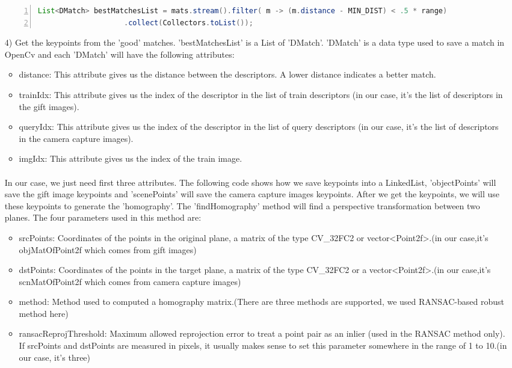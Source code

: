 \begin{enumerate}
\begin{lstlisting}[language={java},
        numbers=left,basicstyle=\small\ttfamily,breaklines=true]
List<DMatch> bestMatchesList = mats.stream().filter( m -> (m.distance - MIN_DIST) < .5 * range)
                    .collect(Collectors.toList());
\end{lstlisting} 
\item[4)] Get the keypoints from the 'good' matches. 'bestMatchesList' is a List of 'DMatch'. 'DMatch' is a data type used to save a match in OpenCv and each 'DMatch' will have the following attributes:
\begin{itemize}
\item distance: This attribute gives us the distance between the descriptors. A lower distance indicates a better match.
\item trainIdx: This attribute gives us the index of the descriptor in the list of train descriptors (in our case, it’s the list of descriptors in the gift images).
\item queryIdx: This attribute gives us the index of the descriptor in the list of query descriptors (in our case, it’s the list of descriptors in the camera capture images).
\item imgIdx: This attribute gives us the index of the train image. 
\end{itemize}
\paragraph{} In our case, we just need first three attributes. The following code shows how we save keypoints into a LinkedList, 'objectPoints' will save the gift image keypoints and 'scenePoints' will save the camera capture images keypoints. After we get the keypoints, we will use these keypoints to generate the 'homography'. The 'findHomography' method will find a perspective transformation between two planes. The four parameters used in this method are:
\begin{itemize}
\item srcPoints: Coordinates of the points in the original plane, a matrix of the type CV\_32FC2 or vector\textless Point2f\textgreater.(in our case,it's objMatOfPoint2f which comes from gift images)
\item dstPoints: Coordinates of the points in the target plane, a matrix of the type CV\_32FC2 or a vector\textless Point2f\textgreater .(in our case,it's scnMatOfPoint2f which comes from camera capture images)
\item method: Method used to computed a homography matrix.(There are three methods are supported, we used RANSAC-based robust method here)
\item ransacReprojThreshold: Maximum allowed reprojection error to treat a point pair as an inlier (used in the RANSAC method only). If srcPoints and dstPoints are measured in pixels, it usually makes sense to set this parameter somewhere in the range of 1 to 10.(in our case, it's three)
\end{itemize}


\end{enumerate}
